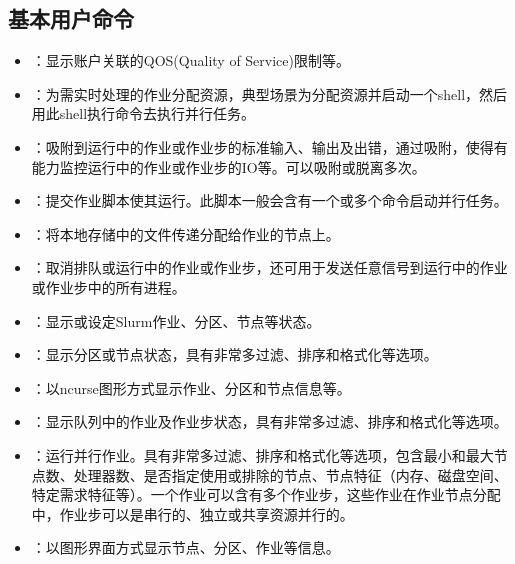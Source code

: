 \subsection{基本用户命令}
\begin{itemize}
	\item {}：显示账户关联的QOS(Quality of Service)限制等。
	\item {}：为需实时处理的作业分配资源，典型场景为分配资源并启动一个shell，然后用此shell执行命令去执行并行任务。
	\item {}：吸附到运行中的作业或作业步的标准输入、输出及出错，通过吸附，使得有能力监控运行中的作业或作业步的IO等。可以吸附或脱离多次。
	\item {}：提交作业脚本使其运行。此脚本一般会含有一个或多个命令启动并行任务。
	\item {}：将本地存储中的文件传递分配给作业的节点上。%
	\item {}：取消排队或运行中的作业或作业步，还可用于发送任意信号到运行中的作业或作业步中的所有进程。
	\item {}：显示或设定Slurm作业、分区、节点等状态。
	\item {}：显示分区或节点状态，具有非常多过滤、排序和格式化等选项。
	\item {}：以ncurse图形方式显示作业、分区和节点信息等。
	\item {}：显示队列中的作业及作业步状态，具有非常多过滤、排序和格式化等选项。
	\item {}：运行并行作业。具有非常多过滤、排序和格式化等选项，包含最小和最大节点数、处理器数、是否指定使用或排除的节点、节点特征（内存、磁盘空间、特定需求特征等）。一个作业可以含有多个作业步，这些作业在作业节点分配中，作业步可以是串行的、独立或共享资源并行的。
	\item {}：以图形界面方式显示节点、分区、作业等信息。
\end{itemize}


